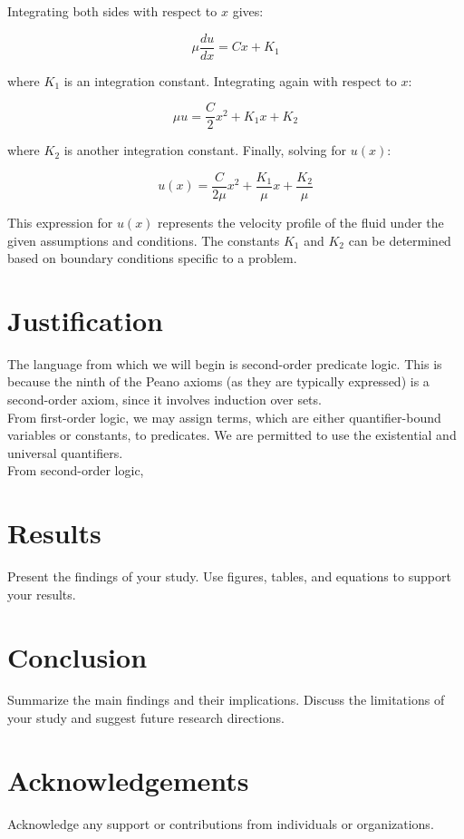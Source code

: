 \documentclass[12pt]{article}
\begin{document}
Integrating both sides with respect to $x$ gives:

\begin{equation}
\mu \frac{du}{dx} = Cx + K_1
\end{equation}

where $K_1$ is an integration constant. Integrating again with respect to $x$:

\begin{equation}
\mu u = \frac{C}{2}x^2 + K_1x + K_2
\end{equation}

where $K_2$ is another integration constant. Finally, solving for $u(x)$:

\begin{equation}
u(x) = \frac{C}{2\mu}x^2 + \frac{K_1}{\mu}x + \frac{K_2}{\mu}
\end{equation}

This expression for $u(x)$ represents the velocity profile of the fluid under the given assumptions and conditions. The constants $K_1$ and $K_2$ can be determined based on boundary conditions specific to a problem.

\section{Justification}
The language from which we will begin is second-order predicate logic.  This is because the ninth of the Peano axioms (as they are typically expressed) is a second-order axiom, since it involves induction over sets.\\

From first-order logic, we may assign terms, which are either quantifier-bound variables or constants, to predicates.  We are permitted to use the existential and universal quantifiers.\\

From second-order logic, 

\section{Results}
Present the findings of your study. Use figures, tables, and equations to support your results.

\section{Conclusion}
Summarize the main findings and their implications. Discuss the limitations of your study and suggest future research directions.

\section*{Acknowledgements}
Acknowledge any support or contributions from individuals or organizations.


\end{document}
